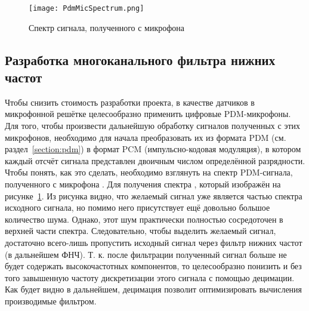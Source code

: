 \begin{figure}[ht]
	\centering
	\texttt{[image: PdmMicSpectrum.png]}  
	\caption{Спектр сигнала, полученного с микрофона \micname{}}
	\label{fig:PdmMicSpectrum}
\end{figure}

\subsection{Разработка многоканального фильтра нижних частот}
\label{section:LowPassFilterBuilding}
 Чтобы снизить стоимость разработки проекта, в качестве датчиков в микрофонной решётке целесообразно применить цифровые PDM-микрофоны. Для того, чтобы произвести дальнейшую обработку сигналов полученных с этих микрофонов, необходимо для начала преобразовать их из формата PDM (см. раздел~\ref{section:pdm}) в формат PCM (импульсно-кодовая модуляция), в котором каждый отсчёт сигнала представлен двоичным числом определённой разрядности. Чтобы понять, как это сделать, необходимо взглянуть на спектр PDM-сигнала, полученного с микрофона \micname{}. Для получения спектра , который изображён на рисунке~\ref{fig:PdmMicSpectrum}. Из рисунка видно, что желаемый сигнал уже является частью спектра исходного сигнала, но помимо него присутствует ещё довольно большое количество шума. Однако, этот шум практически полностью сосредоточен в верхней части спектра. Следовательно, чтобы выделить желаемый сигнал, достаточно всего-лишь пропустить исходный сигнал через фильтр нижних частот (в дальнейшем ФНЧ). Т. к. после фильтрации полученный сигнал больше не будет содержать высокочастотных компонентов, то целесообразно понизить и без того завышенную частоту дискретизации этого сигнала с помощью децимации. Как будет видно в дальнейшем, децимация позволит оптимизировать вычисления производимые фильтром.

